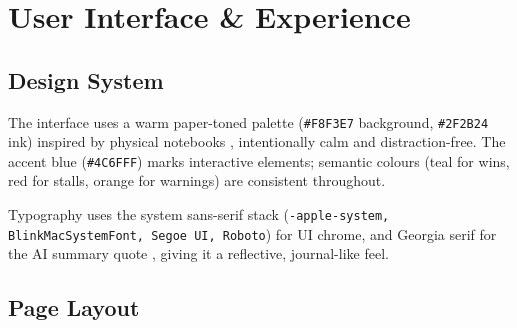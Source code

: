 \documentclass[12pt,a4paper]{article}
\begin{document}
\section{User Interface \& Experience}

\subsection{Design System}

The interface uses a warm paper-toned palette (\texttt{\#F8F3E7} background, \texttt{\#2F2B24} ink) inspired by physical notebooks , intentionally calm and distraction-free. The accent blue (\texttt{\#4C6FFF}) marks interactive elements; semantic colours (teal for wins, red for stalls, orange for warnings) are consistent throughout.

Typography uses the system sans-serif stack (\texttt{-apple-system, BlinkMacSystemFont, Segoe UI, Roboto}) for UI chrome, and Georgia serif for the AI summary quote , giving it a reflective, journal-like feel.

\subsection{Page Layout}
\end{document}

